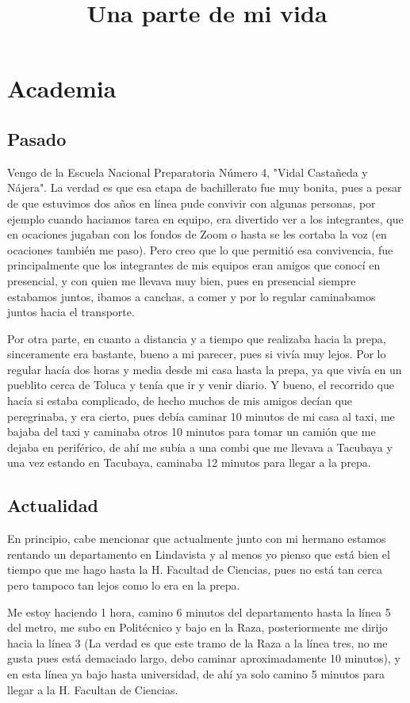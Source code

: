 \documentclass[letterpaper,12pt]{article}
\title{\Huge{Una parte de mi vida}}
\author{\normal{Esteban Villa Rosas }}
\date{\normlal{September 12, 2022}}
\begin{document}
\maketitle

\section{\huge{Academia}}
    \subsection{\Large{Pasado}} \large{Vengo de la Escuela Nacional Preparatoria Número 4, "Vidal Castañeda y Nájera". La verdad es que esa etapa de bachillerato fue muy bonita, pues a pesar de que estuvimos dos años en línea pude convivir con algunas personas, por ejemplo cuando haciamos tarea en equipo, era divertido ver a los integrantes, que en ocaciones jugaban con los fondos de Zoom o hasta se les cortaba la voz (en ocaciones también me paso). Pero creo que lo que permitió esa convivencia, fue principalmente que los integrantes de mis equipos eran amigos que conocí en presencial, y con quien me llevava muy bien, pues en presencial siempre estabamos juntos, ibamos a canchas, a comer y por lo regular caminabamos juntos hacia el transporte.
    
    Por otra parte, en cuanto a distancia y a tiempo que realizaba hacia la prepa, sinceramente era bastante, bueno a mi parecer, pues si vivía muy lejos. Por lo regular hacía dos horas y media desde mi casa hasta la prepa, ya que vivía en un pueblito cerca de Toluca y tenía que ir y venir diario. Y bueno, el recorrido que hacía si estaba complicado, de hecho muchos de mis amigos decían que peregrinaba, y era cierto, pues debía caminar 10 minutos de mi casa al taxi, me bajaba del taxi y caminaba otros 10 minutos para tomar un camión que me dejaba en periférico, de ahí me subía a una combi que me llevava a Tacubaya y una vez estando en  Tacubaya, caminaba 12 minutos para llegar a la prepa.}
    
    \subsection{\Large{Actualidad}} \large{En principio, cabe mencionar que actualmente junto con mi hermano estamos rentando un departamento en Lindavista y al menos yo pienso que está bien el tiempo que me hago hasta la H. Facultad de Ciencias, pues no está tan cerca pero tampoco tan lejos como lo era en la prepa. 
    
    Me estoy haciendo 1 hora, camino 6 minutos del departamento hasta la línea 5 del metro, me subo en Politécnico y bajo en la Raza, posteriormente me dirijo hacia la línea 3 (La verdad es que este tramo de la Raza a la línea tres, no me gusta pues está demaciado largo, debo caminar aproximadamente 10 minutos), y en esta línea ya bajo hasta universidad, de ahí ya solo camino 5 minutos para llegar a la H. Facultan de Ciencias.}
    
\end{document}
